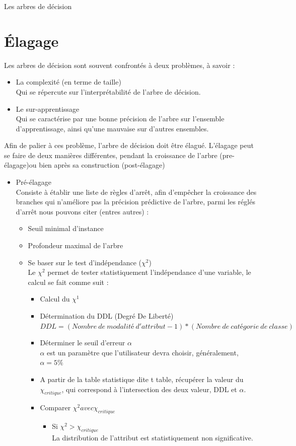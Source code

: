 \documentclass[a4paper, 11pt]{report}
\begin{document}
\begin{chapter}{Les arbres de décision}
\section{Élagage}
Les arbres de décision sont souvent confrontés à deux problèmes, à savoir :
\begin{itemize}
\item La complexité (en terme de taille)\\
Qui se répercute sur l'interprétabilité de l'arbre de décision.
\item Le sur-apprentissage \\
Qui se caractérise par une bonne précision de l'arbre sur l'ensemble d'apprentissage, ainsi qu'une mauvaise sur d'autres ensembles.
\end{itemize}
Afin de palier à ces problème, l'arbre de décision doit être élagué. L'élagage peut se faire de deux manières différentes, pendant la croissance de l'arbre (pre-élagage)ou bien après sa construction (post-élagage)
\\



\begin{itemize}
\item Pré-élagage\\
Consiste à établir une liste de règles d'arrêt, afin d'empêcher la croissance des branches qui n'améliore pas la précision prédictive de l'arbre\cite{esposito1997comparative}, parmi les réglés d'arrêt nous pouvons citer (entres autres) : 
\begin{itemize}
\item Seuil minimal d'instance
\item Profondeur maximal de l'arbre
\item Se baser sur le test d'indépendance ($\chi^2$)\\
Le $\chi^2$ permet de tester statistiquement l'indépendance d'une variable, le calcul se fait comme suit :\\
\begin{itemize}
\item Calcul du $\chi^1$ 
\item Détermination du DDL (Degré De Liberté)\\
$DDL = (Nombre\ de\ modalité\ d'attribut-1)*(Nombre\ de\ catégorie\ de\ classe)$
\item Déterminer le seuil d'erreur $\alpha$\\
$\alpha$ est un paramètre que l'utilisateur devra choisir, généralement, $\alpha=5\%$
\item A partir de la table statistique dite t table, récupérer la valeur du $\chi_{critique}$, qui correspond à l'intersection des deux valeur, DDL et $\alpha$.
\item Comparer $\chi^2 avec \chi_{critique}$
\begin{itemize}
\item Si $\chi^2 > \chi_{critique}$\\
La distribution de l'attribut est statistiquement non significative.
\end{itemize}


\end{itemize}
\end{itemize}
\end{itemize}
\end{chapter}
\end{document}
